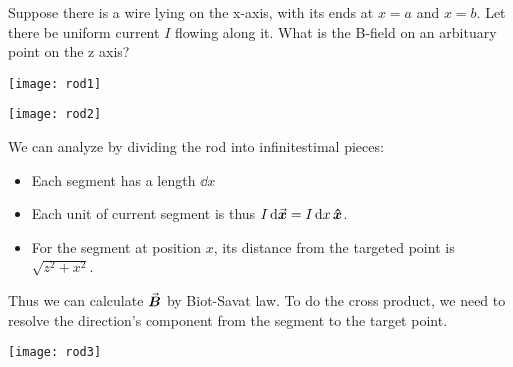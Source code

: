 \documentclass[class=article, crop=false, 12pt]{standalone}
\begin{document}
\newpage
\begin{example}
    Suppose there is a wire lying on the x-axis, 
    with its ends at $x=a$ and $x=b$.
    Let there be uniform current $I$ flowing along it.
    What is the B-field on an arbituary point on the z axis?
    \begin{center}
        \begin{minipage}{0.3\linewidth}
            \centering
            \texttt{[image: rod1]}
        \end{minipage}
        \hspace{0.1\textwidth}
        \begin{minipage}{0.3\linewidth}
            \centering
            \texttt{[image: rod2]}
        \end{minipage}
    \end{center}

    We can analyze by dividing the rod into infinitestimal pieces:
    \begin{itemize}
        \item Each segment has a length $\dd{x}$
        \item Each unit of current segment is thus $I\dd{\va*{x}} = I\dd{x}\vu*{x}$.
        \item For the segment at position $x$, 
        its distance from the targeted point is $\sqrt{z^2+x^2}$.
    \end{itemize}

    Thus we can calculate $\va*{B}$ by Biot-Savat law.
    To do the cross product, 
    we need to resolve the direction's component from the segment to the target point. 

    \begin{minipage}{0.5\linewidth}
    \end{minipage}
    \hspace{0.05\textwidth}
    \begin{minipage}{0.15\linewidth}
        \centering
        \texttt{[image: rod3]}
    \end{minipage}


\end{example}
\end{document}
